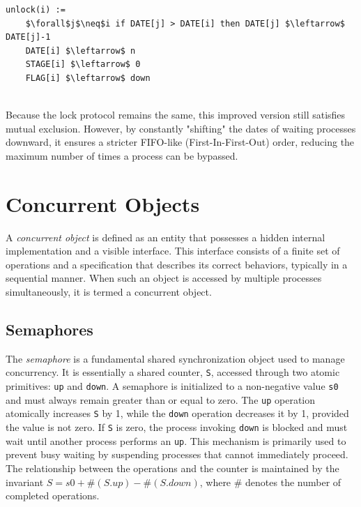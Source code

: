 \begin{minipage}{\textwidth}
\begin{lstlisting}[mathescape]
unlock(i) :=
    $\forall$j$\neq$i if DATE[j] > DATE[i] then DATE[j] $\leftarrow$ DATE[j]-1
    DATE[i] $\leftarrow$ n
    STAGE[i] $\leftarrow$ 0
    FLAG[i] $\leftarrow$ down 
\end{lstlisting}
\end{minipage}\\

Because the lock protocol remains the same, this improved version still satisfies mutual exclusion. However, by constantly "shifting" the dates of waiting processes downward, it ensures a stricter FIFO-like (First-In-First-Out) order, reducing the maximum number of times a process can be bypassed.

\chapter{Concurrent Objects}
A \textit{concurrent object} is defined as an entity that possesses a hidden internal implementation and a visible interface. This interface consists of a finite set of operations and a specification that describes its correct behaviors, typically in a sequential manner. When such an object is accessed by multiple processes simultaneously, it is termed a concurrent object.

\section{Semaphores}
The \textit{semaphore} is a fundamental shared synchronization object used to manage concurrency. It is essentially a shared counter, \texttt{S}, accessed through two atomic primitives: \texttt{up} and \texttt{down}. A semaphore is initialized to a non-negative value \texttt{s0} and must always remain greater than or equal to zero. The \texttt{up} operation atomically increases \texttt{S} by 1, while the \texttt{down} operation decreases it by 1, provided the value is not zero. If \texttt{S} is zero, the process invoking \texttt{down} is blocked and must wait until another process performs an \texttt{up}. This mechanism is primarily used to prevent busy waiting by suspending processes that cannot immediately proceed. The relationship between the operations and the counter is maintained by the invariant $S=s0+\#(S.up)-\#(S.down)$, where $\#$ denotes the number of completed operations.

